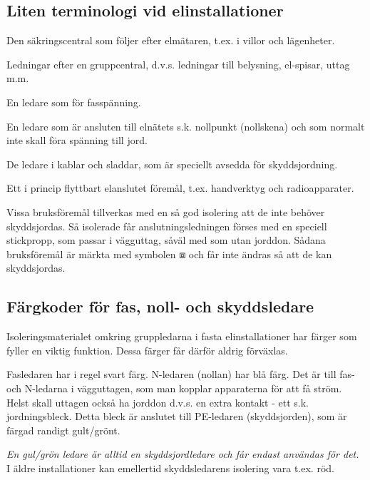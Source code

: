 \subsection{Liten terminologi vid elinstallationer}
\begin{description}[style=nextline]
\item[Gruppcentral] Den säkringscentral som följer efter elmätaren,
  t.ex. i villor och lägenheter.
\item [Gruppledningar] Ledningar efter en gruppcentral, d.v.s.
  ledningar till belysning, el-spisar, uttag m.m.
\item[Fasledare] En ledare som för fasspänning.
\item[Nolledare (N-ledare)] En ledare som är ansluten till elnätets
  s.k.  nollpunkt (nollskena) och som normalt inte skall föra spänning
  till jord.
\item[Skyddsledare (PE-ledare)] De ledare i kablar och sladdar, som är
  speciellt avsedda för skyddsjordning.
\item[Bruksföremål] Ett i princip flyttbart elanslutet föremål,
  t.ex. handverktyg och radioapparater.
\item[Förstärkt isolering] Vissa bruksföremål tillverkas med en så god
  isolering att de inte behöver skyddsjordas. Så isolerade får
  anslutningsledningen förses med en speciell stickpropp, som passar i
  vägguttag, såväl med som utan jorddon. Sådana bruksföremål är märkta
  med symbolen \(\boxbox\) och får inte ändras så att de kan skyddsjordas.
\end{description}

\subsection{Färgkoder för fas, noll- och skyddsledare}

Isoleringsmaterialet omkring gruppledarna i fasta elinstallationer har
färger som fyller en viktig funktion. Dessa färger får därför aldrig
förväxlas.

Fasledaren har i regel svart färg. N-ledaren (nollan) har blå färg.
Det är till fas- och N-ledarna i vägguttagen, som man kopplar
apparaterna för att få ström. Helst skall uttagen också ha jorddon
d.v.s. en extra kontakt - ett s.k. jordningsbleck. Detta bleck är
anslutet till PE-ledaren (skyddsjorden), som är färgad randigt
gult/grönt.

\emph{En gul/grön ledare är alltid en skyddsjordledare och får endast
  användas för det.} I äldre installationer kan emellertid
skyddsledarens isolering vara t.ex. röd.


